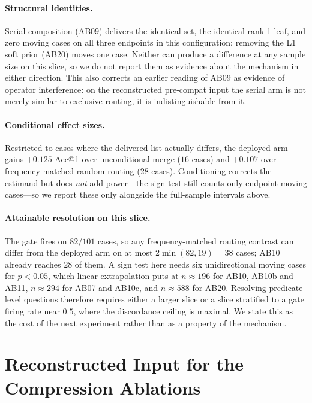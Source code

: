 \paragraph{Structural identities.}
Serial composition (AB09) delivers the identical set, the identical rank-1 leaf, and zero moving cases on all three endpoints in this configuration; removing the L1 soft prior (AB20) moves one case.
Neither can produce a difference at any sample size on this slice, so we do not report them as evidence about the mechanism in either direction.
This also corrects an earlier reading of AB09 as evidence of operator interference: on the reconstructed pre-compat input the serial arm is not merely similar to exclusive routing, it is indistinguishable from it.

\paragraph{Conditional effect sizes.}
Restricted to cases where the delivered list actually differs, the deployed arm gains $+0.125$ Acc@1 over unconditional merge ($16$ cases) and $+0.107$ over frequency-matched random routing ($28$ cases).
Conditioning corrects the estimand but does \emph{not} add power---the sign test still counts only endpoint-moving cases---so we report these only alongside the full-sample intervals above.

\paragraph{Attainable resolution on this slice.}
The gate fires on $82/101$ cases, so any frequency-matched routing contrast can differ from the deployed arm on at most $2\min(82,19)=38$ cases; AB10 already reaches $28$ of them.
A sign test here needs six unidirectional moving cases for $p<0.05$, which linear extrapolation puts at $n\approx196$ for AB10, AB10b and AB11, $n\approx294$ for AB07 and AB10c, and $n\approx588$ for AB20.
Resolving predicate-level questions therefore requires either a larger slice or a slice stratified to a gate firing rate near $0.5$, where the discordance ceiling is maximal.
We state this as the cost of the next experiment rather than as a property of the mechanism.

\section{Reconstructed Input for the Compression Ablations}
\label{app:precompat}

